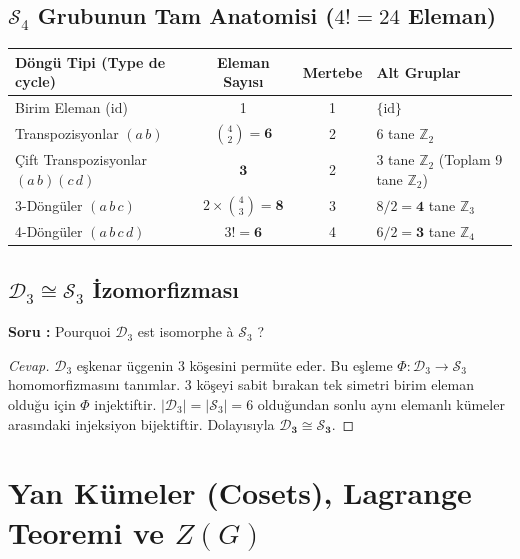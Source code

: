 \documentclass[11pt,a4paper]{article}
\begin{document}
\subsection*{$\mathcal{S}_4$ Grubunun Tam Anatomisi ($4! = 24$ Eleman)}
\begin{center}
\begin{tabular}{|l|c|c|l|}
\hline
\textbf{Döngü Tipi (Type de cycle)} & \textbf{Eleman Sayısı} & \textbf{Mertebe} & \textbf{Alt Gruplar} \\ \hline
Birim Eleman ($\mathrm{id}$) & 1 & 1 & $\{\mathrm{id}\}$ \\ \hline
Transpozisyonlar $(a\,b)$ & $\binom{4}{2} = \mathbf{6}$ & 2 & 6 tane $\mathbb{Z}_2$ \\ \hline
Çift Transpozisyonlar $(a\,b)(c\,d)$ & $\mathbf{3}$ & 2 & 3 tane $\mathbb{Z}_2$ (Toplam 9 tane $\mathbb{Z}_2$) \\ \hline
3-Döngüler $(a\,b\,c)$ & $2 \times \binom{4}{3} = \mathbf{8}$ & 3 & $8/2 = \mathbf{4}$ tane $\mathbb{Z}_3$ \\ \hline
4-Döngüler $(a\,b\,c\,d)$ & $3! = \mathbf{6}$ & 4 & $6/2 = \mathbf{3}$ tane $\mathbb{Z}_4$ \\ \hline
\end{tabular}
\end{center}

\subsection*{$\mathcal{D}_3 \cong \mathcal{S}_3$ İzomorfizması}
\textbf{Soru :} Pourquoi $\mathcal{D}_3$ est isomorphe à $\mathcal{S}_3$ ?  
\begin{proof}[Cevap]
$\mathcal{D}_3$ eşkenar üçgenin 3 köşesini permüte eder. Bu eşleme $\Phi : \mathcal{D}_3 \to \mathcal{S}_3$ homomorfizmasını tanımlar. 3 köşeyi sabit bırakan tek simetri birim eleman olduğu için $\Phi$ injektiftir. $|\mathcal{D}_3| = |\mathcal{S}_3| = 6$ olduğundan sonlu aynı elemanlı kümeler arasındaki injeksiyon bijektiftir. Dolayısıyla $\mathbf{\mathcal{D}_3 \cong \mathcal{S}_3}$.
\end{proof}

\vspace{0.5cm}

\section{Yan Kümeler (Cosets), Lagrange Teoremi ve $Z(G)$}
\end{document}
